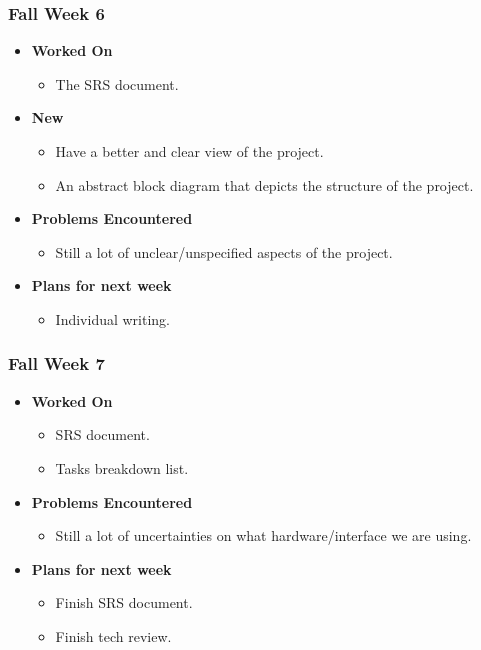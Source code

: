 \documentclass[compsoc,draftclsnofoot,onecolumn,10pt]{IEEEtran}
\begin{document}
\subsubsection{Fall Week 6}
\begin{itemize}
    \item {\textbf{Worked On}}
    \begin{itemize}
      \item The SRS document.
    \end{itemize}

    \item {\textbf{New}}
    \begin{itemize}
      \item Have a better and clear view of the project.
      \item An abstract block diagram that depicts the structure of the project.
    \end{itemize}

    \item {\textbf{Problems Encountered}}
    \begin{itemize}
      \item Still a lot of unclear/unspecified aspects of the project.
    \end{itemize}

    \item{\textbf{Plans for next week}}
    \begin{itemize}
      \item Individual writing.
    \end{itemize}

\end{itemize}

\subsubsection{Fall Week 7}
\begin{itemize}
    \item {\textbf{Worked On}}
    \begin{itemize}
      \item SRS document.
      \item Tasks breakdown list.
    \end{itemize}

    \item {\textbf{Problems Encountered}}
    \begin{itemize}
      \item Still a lot of uncertainties on what hardware/interface we are using.
    \end{itemize}

    \item{\textbf{Plans for next week}}
    \begin{itemize}
      \item Finish SRS document.
      \item Finish tech review.
    \end{itemize}

\end{itemize}
\end{document}
